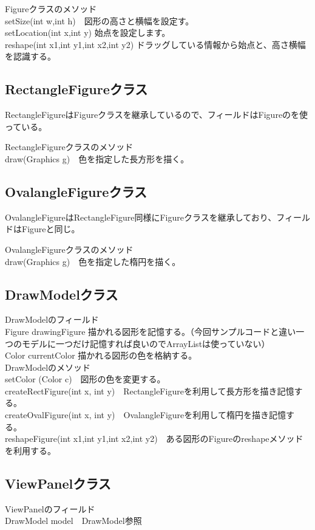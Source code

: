 \documentclass[12pt, a4paper, titlepage]{jsarticle}
\begin{document}
Figureクラスのメソッド\\
setSize(int w,int h)　図形の高さと横幅を設定す。\\
setLocation(int x,int y) 始点を設定します。\\
reshape(int x1,int y1,int x2,int y2) ドラッグしている情報から始点と、高さ横幅を認識する。

\subsection{RectangleFigureクラス}
RectangleFigureはFigureクラスを継承しているので、フィールドはFigureのを使っている。

RectangleFigureクラスのメソッド\\
draw(Graphics g)　色を指定した長方形を描く。
\subsection{OvalangleFigureクラス}
OvalangleFigureはRectangleFigure同様にFigureクラスを継承しており、フィールドはFigureと同じ。

OvalangleFigureクラスのメソッド\\
draw(Graphics g)　色を指定した楕円を描く。
\subsection{DrawModelクラス}
DrawModelのフィールド\\
Figure drawingFigure  描かれる図形を記憶する。（今回サンプルコードと違い一つのモデルに一つだけ記憶すれば良いのでArrayListは使っていない）\\
Color currentColor  描かれる図形の色を格納する。\\

DrawModelのメソッド\\
setColor (Color c)　図形の色を変更する。\\
createRectFigure(int x, int y)　RectangleFigureを利用して長方形を描き記憶する。\\
createOvalFigure(int x, int y)　OvalangleFigureを利用して楕円を描き記憶する。\\
reshapeFigure(int x1,int y1,int x2,int y2)　ある図形のFigureのreshapeメソッドを利用する。\\
\subsection{ViewPanelクラス}
ViewPanelのフィールド\\
DrawModel model　DrawModel参照\\
\end{document}
